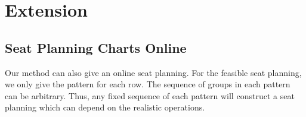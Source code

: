 
\section{Extension}

\subsection{Seat Planning Charts Online}
Our method can also give an online seat planning. For the feasible seat planning, we only give the pattern for each row. The sequence of groups in each pattern can be arbitrary. Thus, any fixed sequence of each pattern will construct a seat planning which can depend on the realistic operations.














